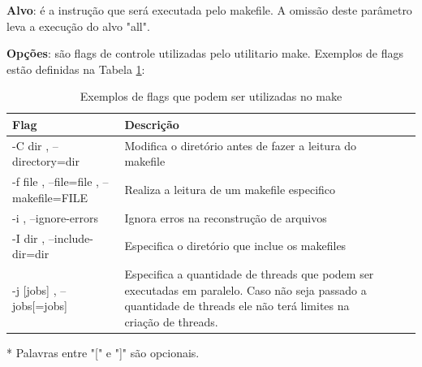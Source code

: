 \textbf{Alvo}: é a instrução que será executada pelo makefile. 
A omissão deste parâmetro leva a execução do alvo "all".
    
\textbf{Opções}: são flags de controle utilizadas pelo utilitario make.
 Exemplos de flags estão definidas na Tabela \ref{tab:tabela_05}:

\begin{table}[h]
    \centering
    \begin{tabular}{ | l|p{10cm} | l|p{10cm} |}
    \hline
    Flag & Descrição\\
    \hline
    -C dir , --directory=dir & Modifica o diretório antes de fazer a leitura do makefile\\
    \hline
    -f file    ,     --file=file     ,  --makefile=FILE & Realiza a leitura de um makefile especifico\\
    \hline
    -i   ,     --ignore-errors & Ignora erros na reconstrução de arquivos\\
    \hline
    -I dir   ,   --include-dir=dir & Especifica o diretório que inclue os makefiles\\
    \hline
    -j [jobs]  , --jobs[=jobs] & Especifica a quantidade de threads
                                 que podem ser executadas em paralelo. 
                                 Caso não seja passado a quantidade de
                                 threads ele não terá limites na criação
                                 de threads.\\
    \hline
    \end{tabular}
    \caption {Exemplos de flags que podem ser utilizadas no make}
    \label{tab:tabela_05}
\end{table}

    * Palavras entre "[" e "]" são opcionais.

